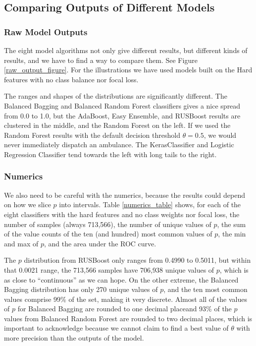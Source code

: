 \FloatBarrier
\subsection{Comparing Outputs of Different Models}
\label{comparing_outputs}

\subsubsection{Raw Model Outputs}
\label{raw_output}

The eight model algorithms not only give different results, but different kinds of results, and we have to find a way to compare them.  See Figure \ref{raw_output_figure}.  For the illustrations we have used models built on the Hard features with no class balance nor focal loss.

The ranges and shapes of the distributions are significantly different.  The Balanced Bagging and  Balanced Random Forest classifiers gives a nice spread from 0.0 to 1.0, but the AdaBoost, Easy Ensemble, and RUSBoost results are clustered in the middle, and the Random Forest on the left.  If we used the Random Forest results with the default decision threshold $\theta = 0.5$, we would never immediately dispatch an ambulance.  The KerasClassifier and Logistic Regression Classifier tend towards the left with long tails to the right.  



\FloatBarrier

\subsubsection{Numerics}
\label{numerics}

We also need to be careful with the numerics, because the results could depend on how we slice $p$ into intervals.  Table \ref{numerics_table} shows, for each of the eight classifiers with the hard features and no class weights nor focal loss, the number of samples (always 713,566), the number of unique values of $p$, the sum of the value counts of the ten (and hundred) most common values of $p$, the min and max of $p$, and the area under the ROC curve.  


The $p$ distribution from RUSBoost only ranges from 0.4990 to 0.5011, but within that 0.0021 range, the 713,566 samples have 706,938 unique values of $p$, which is as close to ``continuous'' as we can hope.  On the other extreme, the Balanced Bagging distribution has only 270 unique values of $p$, and the ten most common values comprise 99\% of the set, making it very discrete.  Almost all of the values of $p$ for Balanced Bagging are rounded to one decimal placeand 93\% of the $p$ values from Balanced Random Forest are rounded to two decimal places, which is important to acknowledge because we cannot claim to find a best value of $\theta$ with more precision than the outputs of the model.

